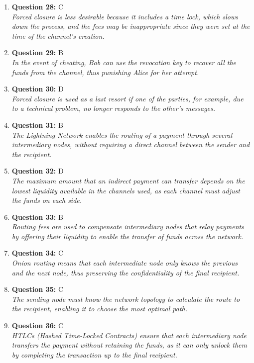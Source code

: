 \documentclass[12pt,a4paper]{article}
\begin{document}
\begin{enumerate}
\item \textbf{Question 28:} C
\\ \textit{Forced closure is less desirable because it includes a time lock, which slows down the process, and the fees may be inappropriate since they were set at the time of the channel's creation.}

\item \textbf{Question 29:} B
\\ \textit{In the event of cheating, Bob can use the revocation key to recover all the funds from the channel, thus punishing Alice for her attempt.}

\item \textbf{Question 30:} D
\\ \textit{Forced closure is used as a last resort if one of the parties, for example, due to a technical problem, no longer responds to the other's messages.}

\item \textbf{Question 31:} B
\\ \textit{The Lightning Network enables the routing of a payment through several intermediary nodes, without requiring a direct channel between the sender and the recipient.}

\item \textbf{Question 32:} D
\\ \textit{The maximum amount that an indirect payment can transfer depends on the lowest liquidity available in the channels used, as each channel must adjust the funds on each side.}

\item \textbf{Question 33:} B
\\ \textit{Routing fees are used to compensate intermediary nodes that relay payments by offering their liquidity to enable the transfer of funds across the network.}

\item \textbf{Question 34:} C
\\ \textit{Onion routing means that each intermediate node only knows the previous and the next node, thus preserving the confidentiality of the final recipient.}

\item \textbf{Question 35:} C
\\ \textit{The sending node must know the network topology to calculate the route to the recipient, enabling it to choose the most optimal path.}

\item \textbf{Question 36:} C
\\ \textit{HTLCs (Hashed Time-Locked Contracts) ensure that each intermediary node transfers the payment without retaining the funds, as it can only unlock them by completing the transaction up to the final recipient.}


\end{enumerate}
\end{document}
